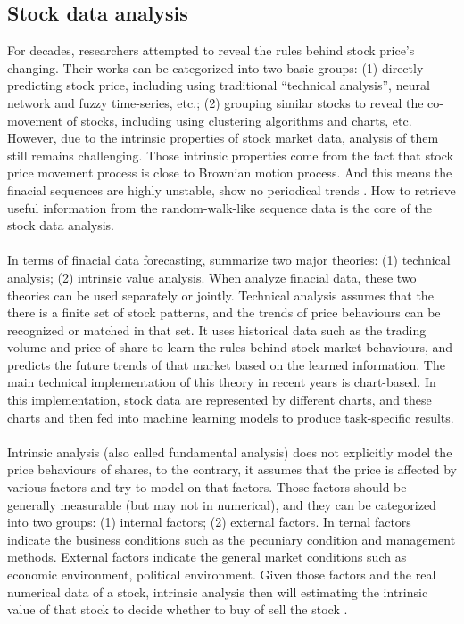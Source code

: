 \subsection{Stock data analysis}
For decades, researchers attempted to reveal the rules behind stock price's changing. Their works can be categorized into two basic groups: (1) directly predicting stock price, including using traditional ``technical analysis'', neural network and fuzzy time-series, etc.; (2) grouping similar stocks to reveal the co-movement of stocks, including using clustering algorithms and charts, etc. However, due to the intrinsic properties of stock market data, analysis of them still remains challenging. Those intrinsic properties come from the fact that stock price movement process is close to Brownian motion process. And this means the finacial sequences are highly unstable, show no periodical trends \cite{tsay2005analysis}. How to retrieve useful information from the random-walk-like sequence data is the core of the stock data analysis. \\
\\In terms of finacial data forecasting, \cite{kumar2015use} summarize two major theories: (1) technical analysis; (2) intrinsic value analysis. When analyze finacial data, these two theories can be used separately or jointly. Technical analysis assumes that the there is a finite set of stock patterns, and the trends of price behaviours can be recognized or matched in that set. It uses historical data such as the trading volume and price of share to learn the rules behind stock market behaviours, and predicts the future trends of that market based on the learned information. The main technical implementation of this theory in recent years is chart-based. In this implementation, stock data are represented by different charts, and these charts and then fed into machine learning models to produce task-specific results. \\
\\Intrinsic analysis (also called fundamental analysis) does not explicitly model the price behaviours of shares, to the contrary, it assumes that the price is affected by various factors and try to model on that factors. Those factors should be generally measurable (but may not in numerical), and they can be categorized into two groups: (1) internal factors; (2) external factors. In ternal factors indicate the business conditions such as the pecuniary condition and management methods. External factors indicate the general market conditions such as economic environment, political environment. Given those factors and the real numerical data of a stock, intrinsic analysis then will estimating the intrinsic value of that stock to decide whether to buy of sell the stock \cite{kumar2015use}.


